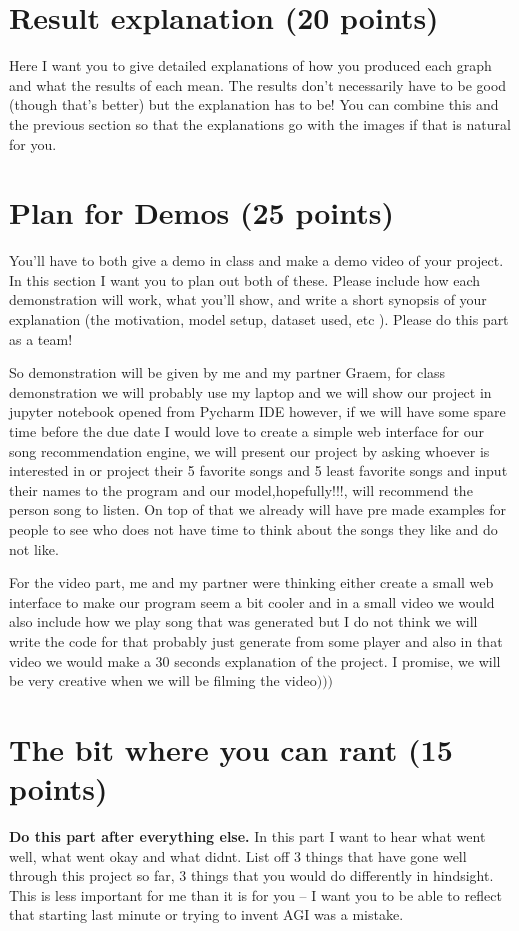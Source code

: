 \documentclass{article}
\begin{document}
\section{Result explanation (20 points)}

Here I want you to give detailed explanations of how you produced each graph and what the results of each mean. The results don't necessarily have to be good (though that's better) but the explanation has to be! You can combine this and the previous section so that the explanations go with the images if that is natural for you.


\section{Plan for Demos (25 points)}

You'll have to both give a demo in class and make a demo video of your project. In this section I want you to plan out both of these. Please include how each demonstration will work, what you'll show, and write a short synopsis of your explanation (the motivation, model setup, dataset used, etc ). Please do this part as a team!

So demonstration will be given by me and my partner Graem, for class demonstration we will probably use my laptop and we will show our project in jupyter notebook opened from Pycharm IDE however, if we will have some spare time before the due date I would love to create a simple web interface for our song recommendation engine, we will present our project by asking whoever is interested in or project their 5 favorite songs and 5 least favorite songs and input their names to the program and our model,hopefully!!!, will recommend the person song to listen. On top of that we already will have pre made examples for people to see who does not have time to think about the songs they like and do not like.

For the video part, me and my partner were thinking either create a small web interface to make our program seem a bit cooler and in a small video we would also include how we play song that was generated but I do not think we will write the code for that probably just generate from some player and also in that video we would make a 30 seconds explanation of the project. I promise, we will be very creative when we will be filming the video$)))$

\section{The bit where you can rant (15 points)} \textbf{Do this part after everything else.} In this part I want to hear what went well, what went okay and what didnt. List off 3 things that have gone well through this project so far, 3 things that you would do differently in hindsight. This is less important for me than it is for you -- I want you to be able to reflect that starting last minute or trying to invent AGI was a mistake.  
\end{document}
